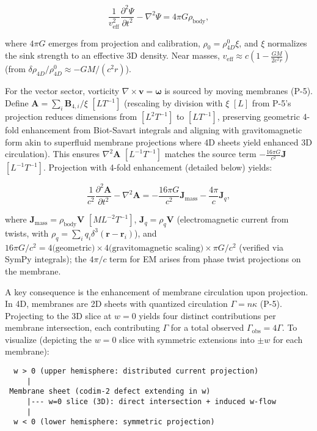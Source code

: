 \begin{equation}
\frac{1}{v_{\text{eff}}^2} \frac{\partial^2 \Psi}{\partial t^2} - \nabla^2 \Psi = 4\pi G \rho_{\text{body}},
\end{equation}

where $4\pi G$ emerges from projection and calibration, $\rho_0 = \rho_{4D}^0 \xi$, and $\xi$ normalizes the sink strength to an effective 3D density. Near masses, $v_{\text{eff}} \approx c \left(1 - \frac{G M}{2 c^2 r}\right)$ (from $\delta \rho_{4D} / \rho_{4D}^0 \approx - G M / (c^2 r)$).

For the vector sector, vorticity $\nabla \times \mathbf{v} = \boldsymbol{\omega}$ is sourced by moving membranes (P-5). Define $\mathbf{A} = \sum_i \mathbf{B}_{4,i} / \xi$ $[L T^{-1}]$ (rescaling by division with $\xi$ $[L]$ from P-5's projection reduces dimensions from $[L^2 T^{-1}]$ to $[L T^{-1}]$, preserving geometric 4-fold enhancement from Biot-Savart integrals and aligning with gravitomagnetic form akin to superfluid membrane projections where 4D sheets yield enhanced 3D circulation). This ensures $\nabla^2 \mathbf{A}$ $[L^{-1} T^{-1}]$ matches the source term $-\frac{16\pi G}{c^2} \mathbf{J}$ $[L^{-1} T^{-1}]$. Projection with 4-fold enhancement (detailed below) yields:

\begin{equation}
\frac{1}{c^2} \frac{\partial^2 \mathbf{A}}{\partial t^2} - \nabla^2 \mathbf{A} = -\frac{16\pi G}{c^2} \mathbf{J}_{\text{mass}} - \frac{4\pi}{c} \mathbf{J}_q,
\end{equation}

where $\mathbf{J}_{\text{mass}} = \rho_{\text{body}} \mathbf{V}$ $[M L^{-2} T^{-1}]$, $\mathbf{J}_q = \rho_q \mathbf{V}$ (electromagnetic current from twists, with $\rho_q = \sum_i q_i \delta^3(\mathbf{r} - \mathbf{r}_i)$), and $16\pi G/c^2 = 4 \text{(geometric)} \times 4 \text{(gravitomagnetic scaling)} \times \pi G/c^2$ (verified via SymPy integrals); the $4\pi/c$ term for EM arises from phase twist projections on the membrane.

A key consequence is the enhancement of membrane circulation upon projection. In 4D, membranes are 2D sheets with quantized circulation $\Gamma = n \kappa$ (P-5). Projecting to the 3D slice at $w=0$ yields four distinct contributions per membrane intersection, each contributing $\Gamma$ for a total observed $\Gamma_{\text{obs}} = 4\Gamma$. To visualize (depicting the $w=0$ slice with symmetric extensions into $\pm w$ for each membrane):

\begin{verbatim}
  w > 0 (upper hemisphere: distributed current projection)
     |
 Membrane sheet (codim-2 defect extending in w)
     |--- w=0 slice (3D): direct intersection + induced w-flow
     |
  w < 0 (lower hemisphere: symmetric projection)
\end{verbatim}

